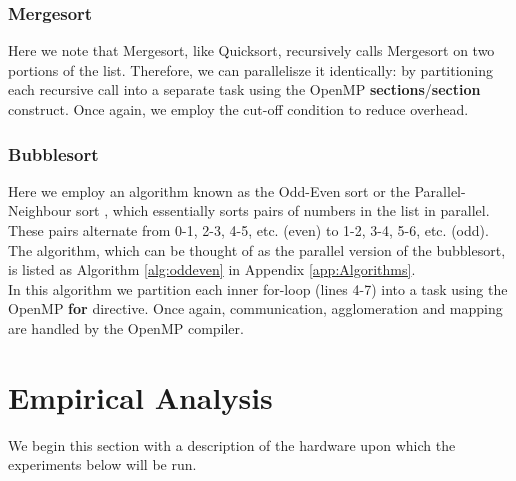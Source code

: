 \documentclass[10pt]{article}
\begin{document}
\subsubsection{Mergesort}
Here we note that Mergesort, like Quicksort, recursively calls Mergesort on two portions of the list. Therefore, we can parallelisze it identically: by partitioning each recursive call into a separate task using the OpenMP \textbf{sections}/\textbf{section} construct. Once again, we employ the cut-off condition to reduce overhead.
\subsubsection{Bubblesort}
Here we employ an algorithm known as the Odd-Even sort or the Parallel-Neighbour sort \cite{habermann72}, which essentially sorts pairs of numbers in the list in parallel. These pairs alternate from 0-1, 2-3, 4-5, etc. (even) to 1-2, 3-4, 5-6, etc. (odd). The algorithm, which can be thought of as the parallel version of the bubblesort, is listed as Algorithm \ref{alg:oddeven} in Appendix \ref{app:Algorithms}.
\\
In this algorithm we partition each inner for-loop (lines 4-7) into a task using the OpenMP \textbf{for} directive. Once again, communication, agglomeration and mapping are handled by the OpenMP compiler.
\section{Empirical Analysis}
We begin this section with a description of the hardware upon which the experiments below will be run.
\end{document}
